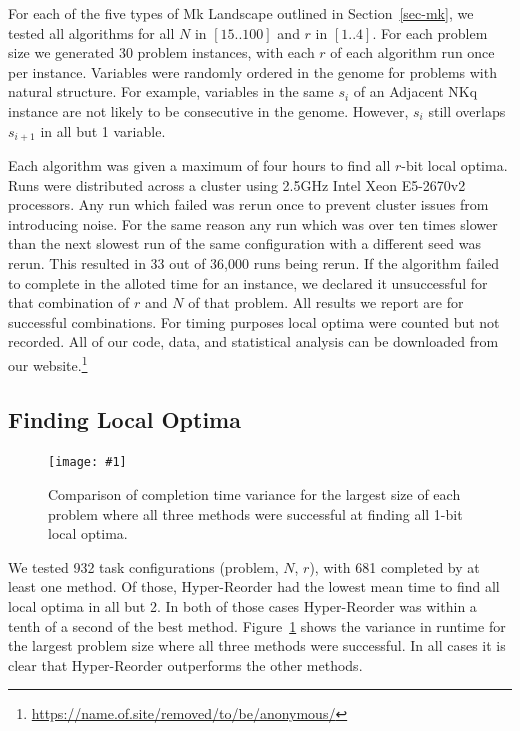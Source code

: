 \documentclass[runningheads,a4paper]{llncs}
\newcommand{\includegraphicsfit}[1]
{\texttt{[image: \#1]}}
\begin{document}
For each of the five types of Mk Landscape outlined in Section~\ref{sec-mk}, we tested all
algorithms for all $N$ in $[15..100]$ and $r$ in $[1..4]$. For each problem size we generated
30 problem instances, with each $r$ of each algorithm run once per instance. Variables were randomly
ordered in the genome for problems with natural structure. For example, variables in the same $s_i$
of an Adjacent NKq instance are not likely to be consecutive in the genome. However, $s_i$ still overlaps
$s_{i+1}$ in all but 1 variable.

Each algorithm was given a maximum of four hours to find all $r$-bit local optima.
Runs were distributed across a cluster using 2.5GHz Intel Xeon E5-2670v2 processors.
Any run which failed was rerun once to prevent cluster issues from introducing
noise. For the same reason any run which was over ten times slower than the next slowest run of the
same configuration with a different seed was rerun. This resulted in 33 out of 36,000 runs being rerun.
If the algorithm failed to complete in the alloted time for an instance,
we declared it unsuccessful for that combination of $r$ and $N$ of that problem. All results
we report are for successful combinations. For timing purposes local optima were counted but not
recorded. All of our code, data, and statistical analysis can be downloaded from our
website.\footnote{\url{https://name.of.site/removed/to/be/anonymous/}}

\subsection{Finding Local Optima}
\label{sec-1-bit-optima}

\begin{figure}
  \centering
  \includegraphicsfit{boxplot-method}
  \caption{Comparison of completion time variance for the largest size of each problem
           where all three methods were successful at finding all 1-bit local optima.}
  \label{fig-boxplot-method}
\end{figure}



We tested 932 task configurations (problem, $N$, $r$), with 681 completed by at least one method.
Of those, Hyper-Reorder had the lowest
mean time to find all local optima in all but 2. In both of those cases Hyper-Reorder was within a tenth of a second
of the best method.
Figure~\ref{fig-boxplot-method} shows the variance in runtime for the largest problem size where all three methods
were successful. In all cases it is clear that Hyper-Reorder outperforms the other methods.
\end{document}
